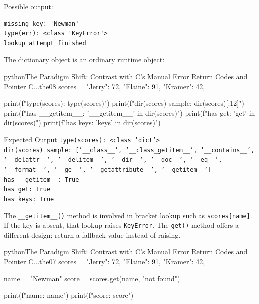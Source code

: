 Possible output:

\begin{verbatim}
missing key: 'Newman'
type(err): <class 'KeyError'>
lookup attempt finished
\end{verbatim}

The dictionary object is an ordinary runtime object:

\begin{codebox}[]{python}{The Paradigm Shift: Contrast with C's Manual Error Return Codes and Pointer C...}{the08}
scores = {
    "Jerry": 72,
    "Elaine": 91,
    "Kramer": 42,
}

print(f"type(scores): {type(scores)}")
print(f"dir(scores) sample: {dir(scores)[:12]}")
print(f"has __getitem__: {'__getitem__' in dir(scores)}")
print(f"has get: {'get' in dir(scores)}")
print(f"has keys: {'keys' in dir(scores)}")
\end{codebox}


\begin{iobox}{Expected Output}
\texttt{type(scores): <class 'dict'>} \\
\texttt{dir(scores) sample: ['\_\_class\_\_', '\_\_class\_getitem\_\_', '\_\_contains\_\_',} \\
\texttt{'\_\_delattr\_\_', '\_\_delitem\_\_', '\_\_dir\_\_', '\_\_doc\_\_', '\_\_eq\_\_',} \\
\texttt{'\_\_format\_\_', '\_\_ge\_\_', '\_\_getattribute\_\_', '\_\_getitem\_\_']} \\
\texttt{has \_\_getitem\_\_: True} \\
\texttt{has get: True} \\
\texttt{has keys: True} \\
\end{iobox}


The \texttt{\_\_getitem\_\_()} method is involved in bracket lookup such as \texttt{scores[name]}. If the key is absent, that lookup raises \texttt{KeyError}. The \texttt{get()} method offers a different design: return a fallback value instead of raising.

\begin{codebox}[]{python}{The Paradigm Shift: Contrast with C's Manual Error Return Codes and Pointer C...}{the07}
scores = {
    "Jerry": 72,
    "Elaine": 91,
    "Kramer": 42,
}

name = "Newman"
score = scores.get(name, "not found")

print(f"name: {name}")
print(f"score: {score}")
\end{codebox}


